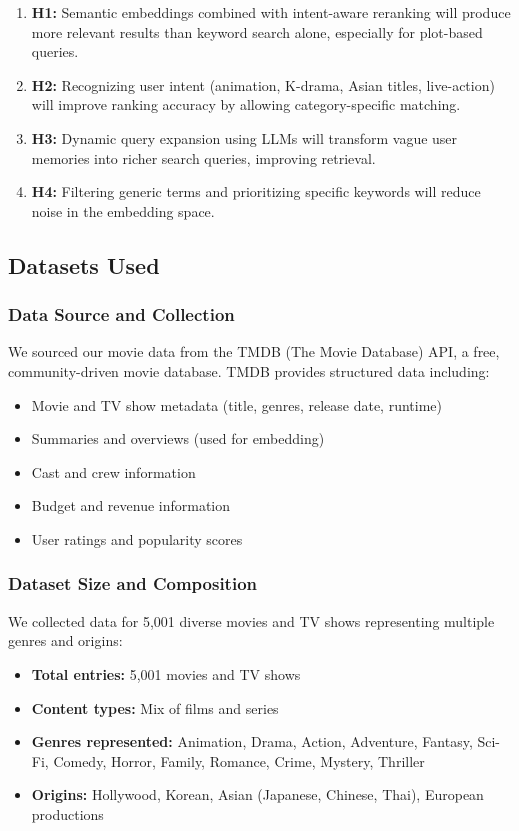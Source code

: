 \documentclass[11pt,a4paper]{article}
\begin{document}
\begin{enumerate}
    \item \textbf{H1:} Semantic embeddings combined with intent-aware reranking will produce more relevant results than keyword search alone, especially for plot-based queries.
    \item \textbf{H2:} Recognizing user intent (animation, K-drama, Asian titles, live-action) will improve ranking accuracy by allowing category-specific matching.
    \item \textbf{H3:} Dynamic query expansion using LLMs will transform vague user memories into richer search queries, improving retrieval.
    \item \textbf{H4:} Filtering generic terms and prioritizing specific keywords will reduce noise in the embedding space.
\end{enumerate}

\subsection{Datasets Used}

\subsubsection{Data Source and Collection}

We sourced our movie data from the TMDB (The Movie Database) API, a free, community-driven movie database. TMDB provides structured data including:

\begin{itemize}
    \item Movie and TV show metadata (title, genres, release date, runtime)
    \item Summaries and overviews (used for embedding)
    \item Cast and crew information
    \item Budget and revenue information
    \item User ratings and popularity scores
\end{itemize}

\subsubsection{Dataset Size and Composition}

We collected data for 5,001 diverse movies and TV shows representing multiple genres and origins:

\begin{itemize}
    \item \textbf{Total entries:} 5,001 movies and TV shows
    \item \textbf{Content types:} Mix of films and series
    \item \textbf{Genres represented:} Animation, Drama, Action, Adventure, Fantasy, Sci-Fi, Comedy, Horror, Family, Romance, Crime, Mystery, Thriller
    \item \textbf{Origins:} Hollywood, Korean, Asian (Japanese, Chinese, Thai), European productions
\end{itemize}
\end{document}

